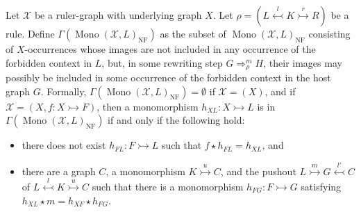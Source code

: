 \begin{definition}
    \label{antipattern:def:gamma_l_rho_x}
    Let $\mathcal{X}$ be a ruler-graph with underlying graph $X$. 
    Let \( \rho \mathop{=} (L \overset{l}{\leftarrowtail} K \overset{r}{\rightarrowtail} R) \) be a rule.
    Define $\Gamma(\operatorname{Mono}(\mathcal{X},L)_{\operatorname{NF}})$ as the subset of $\operatorname{Mono}(\mathcal{X},L)_{\operatorname{NF}}$ consisting of $X$-occurrences whose images are not included in any occurrence of the forbidden context in $L$,
    but, in some rewriting step $G \mathop{\Rightarrow}_\rho^m H$, their images may possibly be included in some occurrence of the forbidden context in the host graph $G$.
    Formally,  $\Gamma(\operatorname{Mono}(\mathcal{X},L)_{\operatorname{NF}}) \mathop{=} \emptyset$ if $\mathcal{X} \mathop{=} (X)$, and if $\mathcal{X} \mathop{=} (X, f:X \rightarrowtail F)$, then a monomorphism $h_{XL}:X \rightarrowtail L$ is in $\Gamma(\operatorname{Mono}(\mathcal{X},L)_{\operatorname{NF}})$ if and only if the following hold:
    \begin{itemize}
        \item there does not exist $h_{FL}:F \rightarrowtail L$ such that $f \mathop{\star} h_{FL} \mathop{=} h_{XL}$, and
         \item  
         there are a graph $C$, a monomorphism $K \overset{u}{\rightarrowtail} C$, and the pushout $L \overset{m}{\rightarrowtail} G \overset{l'}{\leftarrowtail} C$ of $L \overset{l}{\leftarrowtail} K \overset{u}{\rightarrowtail} C$ such that
         there is a monomorphism $h_{FG} : F \rightarrowtail G$ satisfying
         $h_{XL} \mathop{\star} m \mathop{=} h_{XF} \mathop{\star} h_{FG}$. 
      \begin{center}
\end{center}
\end{itemize}
\end{definition}

